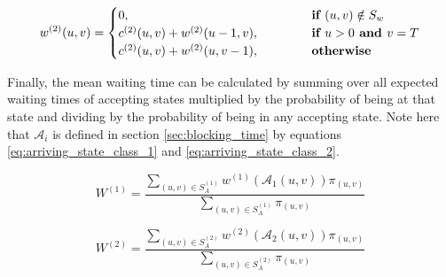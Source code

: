 \begin{equation} \label{eq:waiting_time_at_each_state_type_2}
    w^{(2)}(u,v) = 
    \begin{cases} 
        0, \hspace{4.85cm} & \textbf{if } (u,v) \notin S_w \\
        c^{(2)}(u,v) + w^{(2)}(u-1, v), & \textbf{if } u > 0 \textbf{ and } v = T \\
        c^{(2)}(u,v) + w^{(2)}(u, v-1), & \textbf{otherwise}
    \end{cases}
\end{equation}

Finally, the mean waiting time can be calculated by summing over all expected 
waiting times of accepting states multiplied by the probability of being at that 
state and dividing by the probability of being in any accepting state.
Note here that \( \mathcal{A}_i \) is defined in section 
\ref{sec:blocking_time} by equations \ref{eq:arriving_state_class_1} and
\ref{eq:arriving_state_class_2}.

\begin{equation} \label{eq:recursive_waiting_time_type_1}
    W^{(1)} = \frac{\sum_{(u,v) \in S_A^{(1)}} w^{(1)}
    (\mathcal{A}_1(u,v)) \pi_{(u,v)}}
    {\sum_{(u,v) \in S_A^{(1)}} \pi_{(u,v)}}
\end{equation}

\begin{equation}\label{eq:recursive_waiting_time_type_2}
    W^{(2)} = \frac{\sum_{(u,v) \in S_A^{(2)}} w^{(2)}
    (\mathcal{A}_2(u,v)) \pi_{(u,v)}}
    {\sum_{(u,v) \in S_A^{(2)}} \pi_{(u,v)}}
\end{equation}
